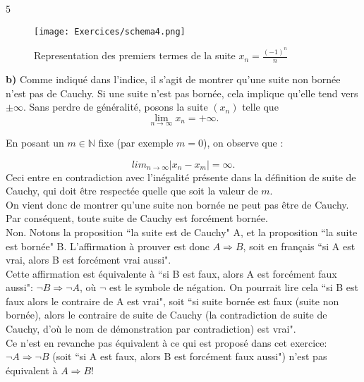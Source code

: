 5\documentclass[a4paper, 12pt, french, twoside]{article}
\newcommand{\Nn}{{\mathbb{N}}}
\begin{document}
\begin{figure}[H]
    \centering
    \texttt{[image: Exercices/schema4.png]}
    \caption{Representation des premiers termes de la suite $x_n=\frac{(-1)^n}{n}$}
    \label{fig:enter-label}
\end{figure}

\textbf{b)} Comme indiqué dans l'indice, il s'agit de montrer qu'une suite non bornée n'est pas de Cauchy. Si une suite n'est pas bornée, cela implique qu'elle tend vers $\pm \infty$. Sans perdre de généralité, posons la suite $(x_n)$ telle que 
\begin{equation*}
    \lim_{n\rightarrow\infty}x_n=+\infty.
\end{equation*}

En posant un $m\in \Nn$ fixe (par exemple $m=0$), on observe que :

\begin{equation}
    lim_{n\to\infty}|x_n-x_m|=\infty.
\end{equation}
Ceci entre en contradiction avec l'inégalité présente dans la définition de suite de Cauchy, qui doit être respectée quelle que soit la valeur de $m$. \\
On vient donc de montrer qu'une suite non bornée ne peut pas être de Cauchy. Par conséquent, toute suite de Cauchy est forcément bornée. \\

\faLightbulbO \quad {} Non. Notons la proposition ``la suite est de Cauchy" A, et la proposition ``la suite est bornée" B. L'affirmation à prouver est donc $A \Rightarrow B$, soit en français ``si A est vrai, alors B est forcément vrai aussi". \\
Cette affirmation est équivalente à ``si B est faux, alors A est forcément faux aussi": $\neg B \Rightarrow \neg A$, où $\neg$ est le symbole de négation. On pourrait lire cela ``si B est faux alors le contraire de A est vrai", soit ``si suite bornée est faux (suite non bornée), alors le contraire de suite de Cauchy (la contradiction de suite de Cauchy, d'où le nom de démonstration par contradiction) est vrai".\\
Ce n'est en revanche pas équivalent à ce qui est proposé dans cet exercice: $\neg A \Rightarrow \neg B$ (soit ``si A est faux, alors B est forcément faux aussi") n'est pas équivalent à $A \Rightarrow B$!
\end{document}
